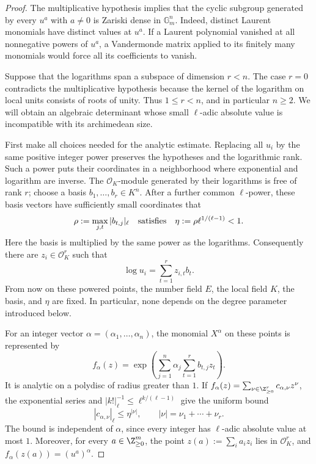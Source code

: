 \begin{proof}
The multiplicative hypothesis implies that the cyclic subgroup
generated by every $u^a$ with $a\ne0$ is Zariski dense in
$\mathbb G_m^n$.  Indeed, distinct Laurent monomials have distinct
values at $u^a$.  If a Laurent polynomial vanished at all nonnegative
powers of $u^a$, a Vandermonde matrix applied to its finitely many
monomials would force all its coefficients to vanish.

Suppose that the logarithms span a subspace of dimension $r<n$.
The case $r=0$ contradicts the multiplicative hypothesis because the
kernel of the logarithm on local units consists of roots of unity.
Thus $1\leq r<n$, and in particular $n\geq2$.  We will obtain an
algebraic determinant whose small $\ell$-adic absolute value is
incompatible with its archimedean size.

First make all choices needed for the analytic estimate.  Replacing
all $u_i$ by the same positive integer power preserves the hypotheses
and the logarithmic rank.  Such a power puts their coordinates in a
neighborhood where exponential and logarithm are inverse.  The
$\mathcal O_K$-module generated by their logarithms is free of rank
$r$; choose a basis $b_1,\ldots,b_r\in K^n$.  After a further common
$\ell$-power, these basis vectors have sufficiently small coordinates
that
\[
 \rho:=\max_{j,t}|b_{t,j}|_\ell
 \quad\hbox{satisfies}\quad
 \eta:=\rho\ell^{1/(\ell-1)}<1.
\]
Here the basis is multiplied by the same power as the logarithms.
Consequently there are $z_i\in\mathcal O_K^r$ such that
\[
 \log u_i=\sum_{t=1}^r z_{i,t}b_t.
\]
From now on these powered points, the number field $E$, the local
field $K$, the basis, and $\eta$ are fixed.  In particular, none
depends on the degree parameter introduced below.

For an integer vector $\alpha=(\alpha_1,\ldots,\alpha_n)$, the
monomial $X^\alpha$ on these points is represented by
\[
 f_\alpha(z)=
 \exp\!\left(\sum_{j=1}^n\alpha_j
                      \sum_{t=1}^r b_{t,j}z_t\right).
\]
It is analytic on a polydisc of radius greater than $1$.  If
$f_\alpha(z)=\sum_{\nu\in\Z_{\geq0}^r}c_{\alpha,\nu}z^\nu$,
the exponential series and
$|k!|_\ell^{-1}\leq\ell^{k/(\ell-1)}$ give the uniform bound
\begin{equation}\label{eq:log-taylor-bound}
 |c_{\alpha,\nu}|_\ell\leq\eta^{|\nu|},
 \qquad |\nu|=\nu_1+\cdots+\nu_r.
\end{equation}
The bound is independent of $\alpha$, since every integer has
$\ell$-adic absolute value at most $1$.  Moreover, for every
$a\in\Z_{\geq0}^m$, the point
$z(a):=\sum_i a_i z_i$ lies in $\mathcal O_K^r$, and
$f_\alpha(z(a))=(u^a)^\alpha$.


\end{proof}
